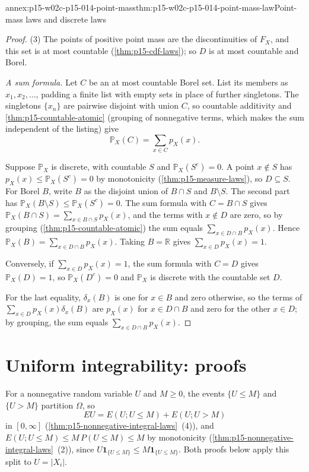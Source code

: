 \begin{annexitem}{annex:p15-w02c-p15-014-point-mass}{thm:p15-w02c-p15-014-point-mass-law}{Point-mass laws and discrete laws}
\begin{proof}
(3) The points of positive point mass are the discontinuities of
\(F_X\), and this set is at most countable
(\cref{thm:p15-cdf-laws}); so \(D\) is at most countable and Borel.

\emph{A sum formula.} Let \(C\) be an at most countable Borel set. List
its members as \(x_1,x_2,\ldots\), padding a finite list with empty
sets in place of further singletons. The singletons \(\{x_n\}\) are
pairwise disjoint with union \(C\), so countable additivity and
\cref{thm:p15-countable-atomic} (grouping of nonnegative terms, which
makes the sum independent of the listing) give
\[
 \mathbb P_X(C)=\sum_{x\in C}p_X(x).
\]

Suppose \(\mathbb P_X\) is discrete, with countable \(S\) and
\(\mathbb P_X(S^c)=0\). A point \(x\notin S\) has
\(p_X(x)\leq\mathbb P_X(S^c)=0\) by monotonicity
(\cref{thm:p15-measure-laws}), so \(D\subseteq S\). For Borel \(B\),
write \(B\) as the disjoint union of \(B\cap S\) and \(B\setminus S\).
The second part has \(\mathbb P_X(B\setminus S)\leq\mathbb P_X(S^c)=0\).
The sum formula with \(C=B\cap S\) gives
\(\mathbb P_X(B\cap S)=\sum_{x\in B\cap S}p_X(x)\), and the terms with
\(x\notin D\) are zero, so by grouping (\cref{thm:p15-countable-atomic})
the sum equals \(\sum_{x\in D\cap B}p_X(x)\). Hence
\(\mathbb P_X(B)=\sum_{x\in D\cap B}p_X(x)\). Taking \(B=\mathbb R\)
gives \(\sum_{x\in D}p_X(x)=1\).

Conversely, if \(\sum_{x\in D}p_X(x)=1\), the sum formula with \(C=D\)
gives \(\mathbb P_X(D)=1\), so \(\mathbb P_X(D^c)=0\) and \(\mathbb P_X\)
is discrete with the countable set \(D\).

For the last equality, \(\delta_x(B)\) is one for \(x\in B\) and zero
otherwise, so the terms of \(\sum_{x\in D}p_X(x)\delta_x(B)\) are
\(p_X(x)\) for \(x\in D\cap B\) and zero for the other \(x\in D\);
by grouping, the sum equals \(\sum_{x\in D\cap B}p_X(x)\).
\end{proof}
\end{annexitem}

\section{Uniform integrability: proofs}
\label{sec:annex-p15-w02c-p15-014-ui-source}

For a nonnegative random variable \(U\) and \(M\geq0\), the events
\(\{U\leq M\}\) and \(\{U>M\}\) partition \(\Omega\), so
\[
 EU=E(U;U\leq M)+E(U;U>M)
\]
in \([0,\infty]\) (\cref{thm:p15-nonnegative-integral-laws}~(4)), and
\(E(U;U\leq M)\leq M\,P(U\leq M)\leq M\) by monotonicity
(\cref{thm:p15-nonnegative-integral-laws}~(2)), since
\(U\mathbf1_{\{U\leq M\}}\leq M\mathbf1_{\{U\leq M\}}\). Both proofs below
apply this split to \(U=|X_i|\).

